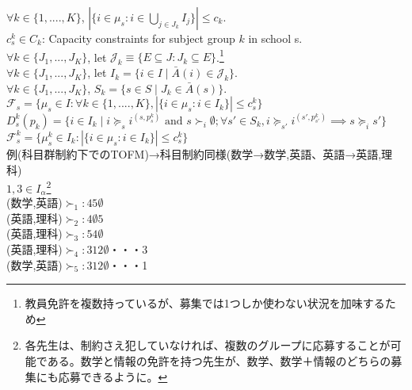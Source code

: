 \documentclass[a4j,10pt]{jsarticle}
\theoremstyle{definition}
\theoremstyle{remark}
\theoremstyle{plain}
\begin{document}
$\forall k \in \{1,....,K\}$, $|\{i \in \mu_s : i \in \bigcup\limits_{j \in J_k} I_j\}| \leq c_k$.\\
$c^k_s \in C_k$: Capacity constraints for subject group $k$ in school s.\\


$\forall k \in \{J_1,...,J_K\}$, let $\mathcal{J}_k \equiv \{ E \subseteq J : J_k \subseteq E\}$.\footnote{教員免許を複数持っているが、募集では1つしか使わない状況を加味するため}\\

$\forall k \in \{J_1,...,J_K\}$, let $I_k = \{i \in I \mid \bar{A}(i) \in \mathcal{J}_k \}$.\\
$\forall k \in \{J_1,...,J_K\}$, $S_k = \{s \in S \mid J_k \in \bar{A}(s)\}$.\\
$\mathcal{F}_s =\{\mu_s \in I: \forall k \in \{1,....,K\}, |\{i \in \mu_s : i \in I_k\}| \leq c^k_s\}$\\
$D^k_s(p_k) = \{ i \in I_k \mid i \succeq_s i^{(s,p^k_s)} \text{ and } s \succ_i \emptyset; \forall s' \in S_k, i \succeq_{s'} i^{(s',p^k_{s'})} \implies s \succeq_i s' \}$\\

$\mathcal{F}^k_s =\{\mu^k_s \in I_k: |\{i \in \mu_s : i \in I_k\}| \leq c^k_s\}$\\

例(科目群制約下でのTOFM)→科目制約同様(数学→数学,英語、英語→英語,理科)\\
$1,3 \in I_\alpha$\footnote{各先生は、制約さえ犯していなければ、複数のグループに応募することが可能である。数学と情報の免許を持つ先生が、数学、数学＋情報のどちらの募集にも応募できるように。}\\
(数学,英語)$\succ_1:45\emptyset$\\
(英語,理科)$\succ_2:4\emptyset 5$\\
(英語,理科)$\succ_3:54\emptyset$\\
(英語,理科)$\succ_4:312\emptyset$・・・3\\
(数学,英語)$\succ_5:312\emptyset$・・・1\\
\end{document}
